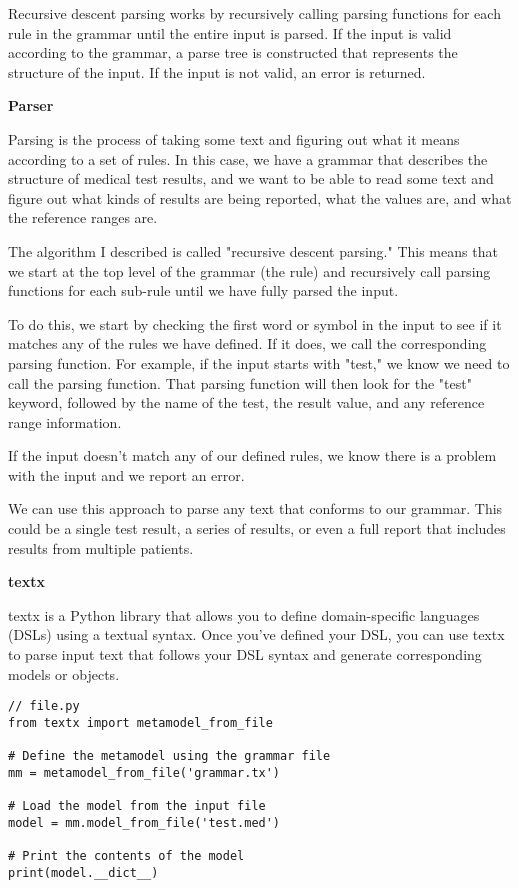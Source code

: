 Recursive descent parsing works by recursively calling parsing functions for each rule in the grammar until the entire input is parsed. If the input is valid according to the grammar, a parse tree is constructed that represents the structure of the input. If the input is not valid, an error is returned.

\textbf{Parser}

Parsing is the process of taking some text and figuring out what it means according to a set of rules. In this case, we have a grammar that describes the structure of medical test results, and we want to be able to read some text and figure out what kinds of results are being reported, what the values are, and what the reference ranges are.

The algorithm I described is called "recursive descent parsing." This means that we start at the top level of the grammar (the rule) and recursively call parsing functions for each sub-rule until we have fully parsed the input.

To do this, we start by checking the first word or symbol in the input to see if it matches any of the rules we have defined. If it does, we call the corresponding parsing function. For example, if the input starts with "test," we know we need to call the parsing function. That parsing function will then look for the "test" keyword, followed by the name of the test, the result value, and any reference range information.

If the input doesn't match any of our defined rules, we know there is a problem with the input and we report an error.

We can use this approach to parse any text that conforms to our grammar. This could be a single test result, a series of results, or even a full report that includes results from multiple patients.

\textbf{textx}

textx is a Python library that allows you to define domain-specific languages (DSLs) using a textual syntax. Once you've defined your DSL, you can use textx to parse input text that follows your DSL syntax and generate corresponding models or objects.

\begin{lstlisting}
// file.py
from textx import metamodel_from_file

# Define the metamodel using the grammar file
mm = metamodel_from_file('grammar.tx')

# Load the model from the input file
model = mm.model_from_file('test.med')

# Print the contents of the model
print(model.__dict__)
\end{lstlisting}


